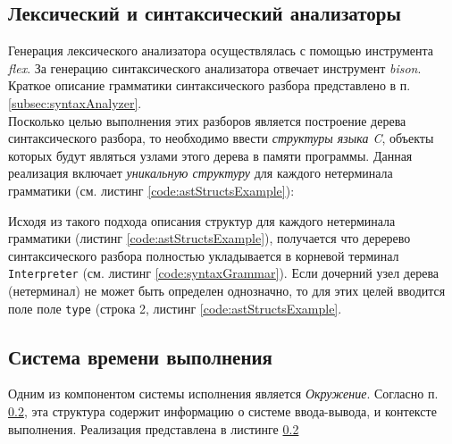 \documentclass[12pt]{article}
\begin{document}
		\subsection{Лексический и синтаксический анализаторы}
			\hspace{\parindent}Генерация лексического анализатора осуществлялась с помощью инструмента {\it flex}.
			\indent За генерацию синтаксического анализатора отвечает инструмент {\it bison}. Краткое описание грамматики синтаксического разбора представлено в п. \ref{subsec:syntaxAnalyzer}. \\
			\indent Посколько целью выполнения этих разборов является построение дерева синтаксического разбора, то необходимо ввести {\it структуры языка C}, объекты которых будут являться узлами этого дерева в памяти программы. Данная реализация включает {\it уникальную структуру} для каждого нетерминала грамматики (см. листинг \ref{code:astStructsExample}):
			
			
			\indent Исходя из такого подхода описания структур для каждого нетерминала грамматики (листинг \ref{code:astStructsExample}), получается что деререво синтаксического разбора полностью укладывается в корневой терминал {\tt Interpreter} (см. листинг \ref{code:syntaxGrammar}). Если дочерний узел дерева (нетерминал) не может быть определен однозначно, то для этих целей вводится поле поле {\tt type} (строка 2, листинг \ref{code:astStructsExample}. 
		\subsection{Система времени выполнения}
			\hspace{\parindent} Одним из компонентом системы исполнения является {\it Окружение}. Согласно п. \ref{}, эта структура содержит информацию о системе ввода-вывода, и контексте выполнения. Реализация представлена в листинге \ref{}
\end{document}
